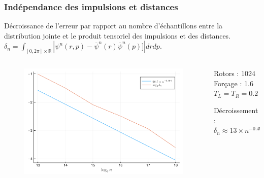 \begin{frame}

    \frametitle{Indépendance des impulsions et distances}

    Décroissance de l'erreur par rapport au nombre d'échantillons
    entre la distribution jointe et le produit tensoriel des
    impulsions et des distances.
    $\delta_n = \int_{[0,2\pi] \times \mathbb{R}} |\psi^n(r,p)
    - \overline \psi^n(r) \overline \psi^n(p)]| dr dp.$

    \begin{columns}

        \begin{column}{0.8\textwidth}
            \begin{figure}
                \includegraphics[scale=0.4]{plots/distribution_error.pdf}
            \end{figure}
        \end{column}

        \begin{column}{0.2\textwidth}
            \scriptsize
            Rotors : 1024
            Forçage : 1.6
            $T_L = T_R = 0.2$

            \vspace{2.0mm}

            Décroissement :
            $\delta_n \approx 13 \times n^{-0.491}$

        \end{column}

    \end{columns}

\end{frame}

